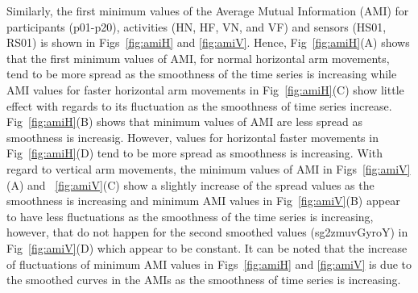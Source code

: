Similarly, the first minimum values of the Average Mutual Information (AMI) 
for participants (p01-p20), activities (HN, HF, VN, and VF) and 
sensors (HS01, RS01) is shown in Figs~\ref{fig:amiH} and \ref{fig:amiV}.
Hence, Fig~\ref{fig:amiH}(A) shows that the first minimum values of AMI,
for normal horizontal arm movements, tend to be more spread as the smoothness 
of the time series is increasing while AMI values for faster horizontal arm 
movements in Fig~\ref{fig:amiH}(C) show little effect with regards
to its fluctuation as the smoothness of time series increase.
Fig~\ref{fig:amiH}(B) shows that minimum values of AMI are 
less spread as smoothness is increasig. However, values for horizontal
faster movements in Fig~\ref{fig:amiH}(D) tend to be more spread as 
smoothness is increasing.
With regard to vertical arm movements,
the minimum values of AMI in Figs~\ref{fig:amiV}(A) and ~\ref{fig:amiV}(C) 
show a slightly increase of the spread values as the smoothness is increasing
and minimum AMI values in Fig~\ref{fig:amiV}(B) appear to have less 
fluctuations as the smoothness of the time series is increasing, however, 
that do not happen for the second smoothed values (sg2zmuvGyroY) in 
Fig~\ref{fig:amiV}(D) which appear to be constant.
It can be noted that the increase of fluctuations of minimum AMI values 
in Figs~\ref{fig:amiH} and \ref{fig:amiV} is due to the smoothed curves in 
the AMIs as the smoothness of time series is increasing.

